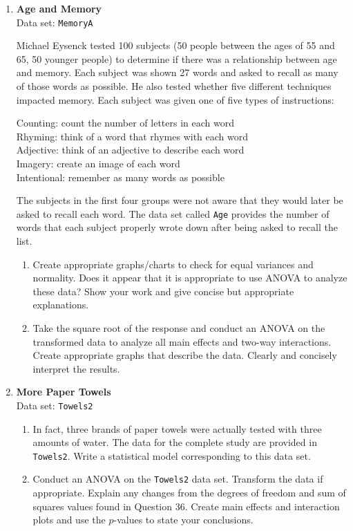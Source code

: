 \documentclass[
]{book}
\begin{document}
\begin{enumerate}
  \item \textbf{Age and Memory}\\
  Data set: \texttt{MemoryA}

Michael Eysenck tested 100 subjects (50 people between the ages of 55 and 65, 50 younger people) to determine if there was a relationship between age and memory. Each subject was shown 27 words and asked to recall as many of those words as possible. He also tested whether five different techniques impacted memory. Each subject was given one of five types of instructions:

Counting: count the number of letters in each word \\
Rhyming: think of a word that rhymes with each word \\
Adjective: think of an adjective to describe each word \\
Imagery: create an image of each word \\
Intentional: remember as many words as possible

The subjects in the first four groups were not aware that they would later be asked to recall each word. The data set called \texttt{Age} provides the number of words that each subject properly wrote down after being asked to recall the list.

  \begin{enumerate}
    \item Create appropriate graphs/charts to check for equal variances and normality. Does it appear that it is appropriate to use ANOVA to analyze these data? Show your work and give concise but appropriate explanations.
    \item Take the square root of the response and conduct an ANOVA on the transformed data to analyze all main effects and two-way interactions. Create appropriate graphs that describe the data. Clearly and concisely interpret the results.
  \end{enumerate}

  \item \textbf{More Paper Towels}\\
  Data set: \texttt{Towels2}
  \begin{enumerate}
    \item In fact, three brands of paper towels were actually tested with three amounts of water. The data for the complete study are provided in \texttt{Towels2}. Write a statistical model corresponding to this data set.
    \item Conduct an ANOVA on the \texttt{Towels2} data set. Transform the data if appropriate. Explain any changes from the degrees of freedom and sum of squares values found in Question 36. Create main effects and interaction plots and use the $p$-values to state your conclusions.
  \end{enumerate}


\end{enumerate}
\end{document}
